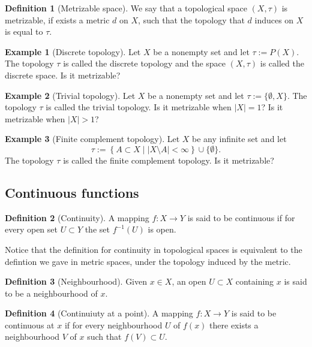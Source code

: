 \documentclass[11pt,a4paper]{article}
\theoremstyle{definition}
\newtheorem{definition}{Definition}[section]
\newtheorem{example}{Example}[section]
\theoremstyle{plain}
\newcommand{\set}[2]{ \left\{ #1 \mid #2 \right\} }
\newcommand{\abs}[1]{\left\lvert #1\right\rvert}
\begin{document}
  \begin{definition}[Metrizable space]
    We say that a topological space $(X,\tau)$ is metrizable, if exists a 
    metric $d$ on $X$, such that the topology that $d$ induces on $X$
    is equal to $\tau$.
  \end{definition}

  \begin{example}[Discrete topology]
    Let $X$ be a nonempty set and let $\tau := P(X)$. The topology $\tau$
    is called the discrete topology and the space $(X,\tau)$ is called the 
    discrete space. Is it metrizable?
  \end{example}

  \begin{example}[Trivial topology]
    Let $X$ be a nonempty set and let $\tau := \{\emptyset,X\}$. The topology 
    $\tau$ is called the trivial topology. Is it metrizable when $|X| = 1$?
    Is it metrizable when $|X| > 1$?
  \end{example}

  \begin{example}[Finite complement topology]
    Let $X$ be any infinite set and let 
    \[
      \tau := \set{A \subset X}{\abs{X \setminus A} < \infty} \cup
      \{\emptyset\}.
    \]
    The topology $\tau$ is called the finite complement topology. Is it 
    metrizable?
  \end{example}
  
  \subsection{Continuous functions}

  \begin{definition}[Continuity]
    A mapping $f \colon X \to Y$ is said to be continuous if for every open
    set $U \subset Y$ the set $f^{-1}(U)$ is open.
  \end{definition}

  Notice that the definition for continuity in topological spaces is equivalent
  to the defintion we gave in metric spaces, under the topology induced by
  the metric.

  \begin{definition}[Neighbourhood]
    Given $x \in X$, an open $U \subset X$ containing $x$ is said to be a
    neighbourhood of $x$.
  \end{definition}

  \begin{definition}[Continuiuty at a point]
    A mapping $f \colon X \to Y$ is said to be continuous at $x$ if for 
    every neighbourhood $U$ of $f(x)$ there exists a neighbourhood $V$
    of $x$ such that $f(V) \subset U$.
  \end{definition}
\end{document}
